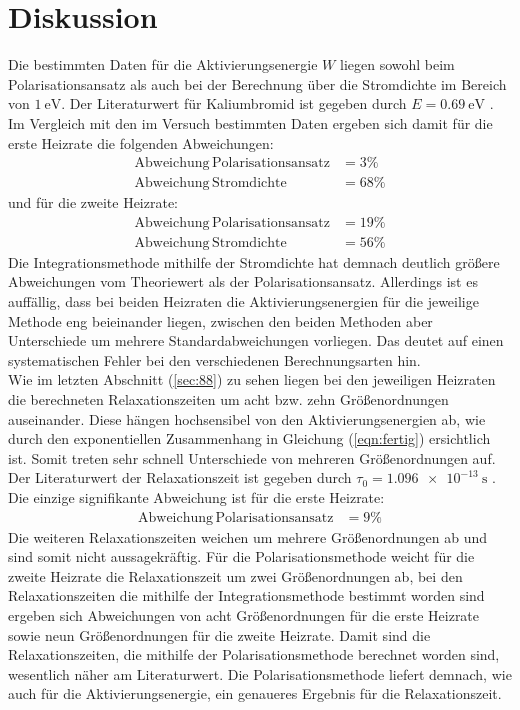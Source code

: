 \section{Diskussion}
\label{sec:Diskussion}
Die bestimmten Daten für die Aktivierungsenergie $W$ liegen sowohl beim Polarisationsansatz als auch bei der Berechnung über die Stromdichte im Bereich von $\SI{1}{\electronvolt}$.
Der Literaturwert für Kaliumbromid ist gegeben durch $E=\SI{0.69}{\electronvolt}$ \cite[5]{Anleitung6}.
Im Vergleich mit den im Versuch bestimmten Daten ergeben sich damit für die erste Heizrate die folgenden Abweichungen:
\begin{align*}
 \mathrm{Abweichung \, Polarisationsansatz}&=3\% \\
 \mathrm{Abweichung \, Stromdichte}&=68\%
\end{align*}
und für die zweite Heizrate:
\begin{align*}
 \mathrm{Abweichung \, Polarisationsansatz}&=19\% \\
 \mathrm{Abweichung \, Stromdichte}&=56\%
\end{align*}
Die Integrationsmethode mithilfe der Stromdichte hat demnach deutlich größere Abweichungen vom Theoriewert als der Polarisationsansatz.
Allerdings ist es auffällig, dass bei
beiden Heizraten die Aktivierungsenergien für die jeweilige Methode eng beieinander liegen, zwischen den beiden Methoden aber Unterschiede um mehrere Standardabweichungen vorliegen. Das deutet auf einen systematischen Fehler bei den verschiedenen Berechnungsarten hin.\\
Wie im letzten Abschnitt (\ref{sec:88}) zu sehen liegen bei den jeweiligen Heizraten die berechneten Relaxationszeiten um acht bzw. zehn Größenordnungen auseinander. Diese hängen hochsensibel von den Aktivierungsenergien ab, wie durch den exponentiellen Zusammenhang in Gleichung (\ref{eqn:fertig}) ersichtlich ist. Somit treten sehr schnell Unterschiede von mehreren Größenordnungen auf.
Der Literaturwert der Relaxationszeit ist gegeben durch $\tau_\mathrm{0}=\SI{1.096 e-13}{\second}$ \cite[5]{Anleitung6}. Die einzige signifikante Abweichung ist für die erste Heizrate:
\begin{align*}
 \mathrm{Abweichung \, Polarisationsansatz}&=9\%
\end{align*}
Die weiteren Relaxationszeiten weichen um mehrere Größenordnungen ab und sind somit nicht aussagekräftig. Für die Polarisationsmethode weicht für die zweite Heizrate die Relaxationszeit um zwei Größenordnungen ab, bei
den Relaxationszeiten die mithilfe der Integrationsmethode bestimmt worden sind ergeben sich Abweichungen von acht Größenordnungen für die erste Heizrate sowie neun Größenordnungen für die zweite Heizrate.
Damit sind die Relaxationszeiten, die mithilfe der Polarisationsmethode berechnet worden sind, wesentlich näher am Literaturwert. Die Polarisationsmethode liefert demnach, wie auch für die Aktivierungsenergie, ein genaueres Ergebnis für die Relaxationszeit.
